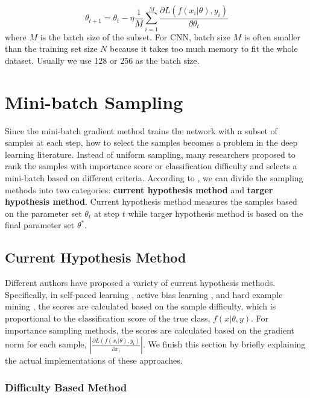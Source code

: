 \begin{equation}
	\theta_{t+1} = \theta_t - \eta \frac{1}{M} \sum_{i=1}^{M}
 \frac{\partial{L(f(x_i|\theta), y_i)}}{\partial{\theta_t}}
\end{equation}
where $M$ is the batch size of the subset. For CNN, batch size $M$ is often smaller than the training set size $N$ because it takes too much memory to fit the whole dataset. Usually we use 128 or 256 as the batch size. 

\section{Mini-batch Sampling}
Since the mini-batch gradient method trains the network with a subset of samples at each step, how to select the samples becomes a problem in the deep learning literature. Instead of uniform sampling, many researchers proposed to rank the samples with importance score or classification difficulty and selects a mini-batch based on different criteria. According to \cite{Hacohen2019a}, we can divide the sampling methods into two categories: \textbf{current hypothesis method} and \textbf{targer hypothesis method}. Current hypothesis method measures the samples based on the parameter set $\theta_t$ at step $t$ while targer hypothesis method is based on the final parameter set $\theta^*$. 

\subsection{Current Hypothesis Method}
Different authors have proposed a variety of current hypothesis methods. Specifically, in self-paced learning \cite{Kumar2010, Li2017}, active bias learning \cite{Chang2017}, and hard example mining \cite{Shrivastava2016}, the scores are calculated based on the sample difficulty, which is proportional to the classification score of the true class, $f(x|\theta, y)$. For importance sampling methods, the scores are calculated based on the gradient norm for each sample, $|\frac{\partial{L(f(x_i|\theta), y_i)}}{\partial{x_i}}|$. We finish this section by briefly explaining the actual implementations of these approaches.

\subsubsection{Difficulty Based Method}

